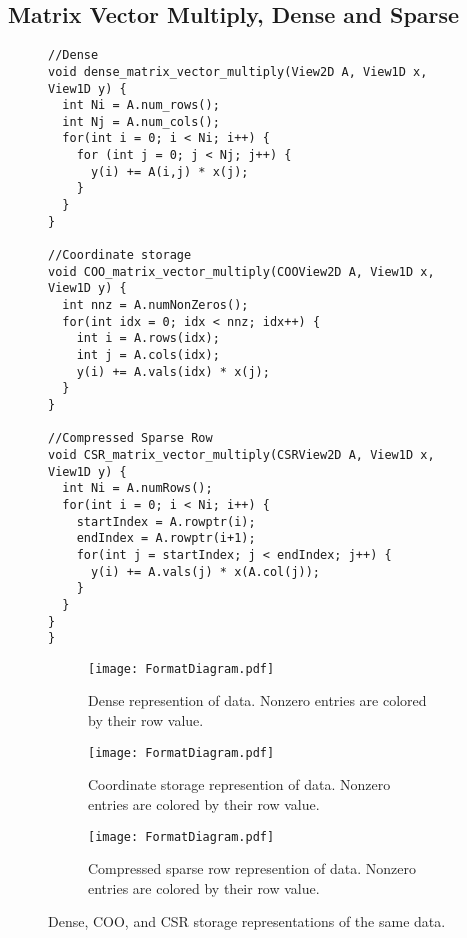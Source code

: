 \subsection{Matrix Vector Multiply, Dense and Sparse}
\begin{figure}
\begin{lstlisting}[caption={Matrix vector multiply routines for matrices in different formats.},label=DenseAndSparseMV]  
//Dense
void dense_matrix_vector_multiply(View2D A, View1D x, View1D y) {
  int Ni = A.num_rows();
  int Nj = A.num_cols();
  for(int i = 0; i < Ni; i++) {
    for (int j = 0; j < Nj; j++) {
      y(i) += A(i,j) * x(j);
    }
  }
}

//Coordinate storage
void COO_matrix_vector_multiply(COOView2D A, View1D x, View1D y) {
  int nnz = A.numNonZeros();
  for(int idx = 0; idx < nnz; idx++) {
    int i = A.rows(idx);
    int j = A.cols(idx);
    y(i) += A.vals(idx) * x(j);
  }
}

//Compressed Sparse Row
void CSR_matrix_vector_multiply(CSRView2D A, View1D x, View1D y) {
  int Ni = A.numRows();
  for(int i = 0; i < Ni; i++) {
    startIndex = A.rowptr(i);
    endIndex = A.rowptr(i+1);
    for(int j = startIndex; j < endIndex; j++) {
      y(i) += A.vals(j) * x(A.col(j));
    }
  }
}
}
\end{lstlisting}
\end{figure}
\begin{figure*}
  \centering
  \begin{subfigure}{0.45\textwidth}
    \texttt{[image: FormatDiagram.pdf]}
    \caption{Dense represention of data. Nonzero entries are colored by their row value.}\label{FormatDiagram:Dense}
  \end{subfigure}
  \begin{subfigure}{0.45\textwidth}
    \texttt{[image: FormatDiagram.pdf]}
    \caption{Coordinate storage represention of data. Nonzero entries are colored by their row value.}\label{FormatDiagram:COO}
  \end{subfigure}

  \begin{subfigure}[c]{0.45\textwidth}
    \texttt{[image: FormatDiagram.pdf]}
    \caption{Compressed sparse row represention of data. Nonzero entries are colored by their row value.}\label{FormatDiagram:CSR}
  \end{subfigure}
\caption{Dense, COO, and CSR storage representations of the same data.}\label{FormatDiagram}
\end{figure*}

